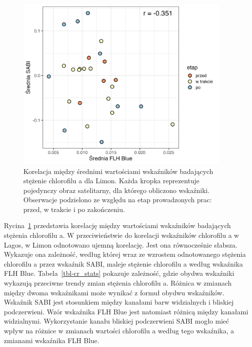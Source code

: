\documentclass{amuthesis}
\begin{document}
\begin{figure}[t]

{\centering \includegraphics[width=4.16667in,height=\textheight]{figures/costarica/sabi_flhblue_corr.png}

}

\caption{\label{fig-cr_sabi_flhblue_corr}Korelacja między średnimi
wartościami wskaźników badających stężenie chlorofilu a dla Limon. Każda
kropka reprezentuje pojedynczy obraz satelitarny, dla którego obliczono
wskaźniki. Obserwacje podzielono ze względu na etap prowadzonych prac:
przed, w trakcie i po zakończeniu.}

\end{figure}

Rycina~\ref{fig-cr_sabi_flhblue_corr} przedstawia korelację między
wartościami wskaźników badających stężenia chlorofilu a. W
przeciwieństwie do korelacji wskaźników chlorofilu a w Lagos, w Limon
odnotowano ujemną korelację. Jest ona równocześnie słabsza. Wykazuje ona
zależność, według której wraz ze wzrostem odnotowanego stężenia
chlorofilu a przez wskaźnik SABI, maleje stężenie chlorofilu a według
wskaźnika FLH Blue. Tabela~\ref{tbl-cr_stats} pokazuje zależność, gdzie
obydwa wskaźniki wykazują przeciwne trendy zmian stężenia chlorofilu a.
Różnica w zmianach między dwoma wskaźnikami może wynikać z formuł obydwu
wskaźników. Wskaźnik SABI jest stosunkiem między kanałami barw
widzialnych i bliskiej podczerwieni. Wzór wskaźnika FLH Blue jest
natomiast różnicą między kanałami widzialnymi. Wykorzystanie kanału
bliskiej podczerwieni SABI mogło mieć wpływ na różnice w zmianach
wartości chlorofilu a według tego wskaźnika, a zmianami wskaźnika FLH
Blue.
\end{document}
